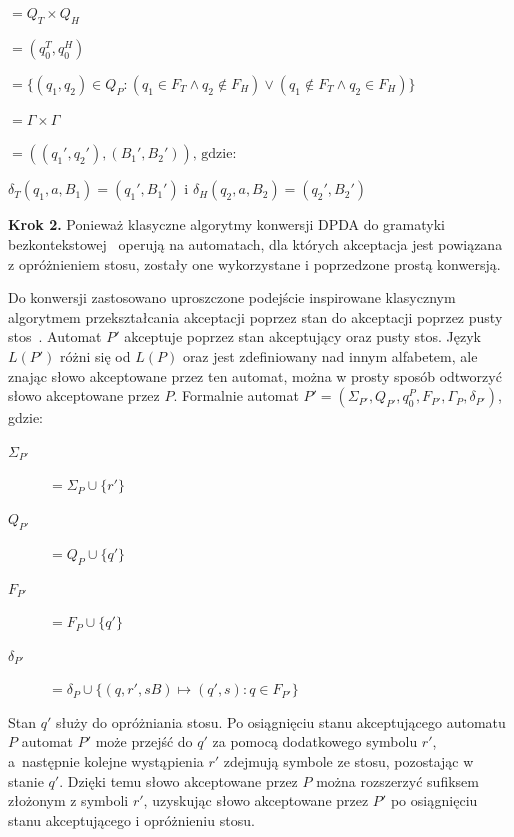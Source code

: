 \begin{description}
    \item[$Q_P$] $ = Q_T \times Q_H$
    \item[$q_0^P$] $ = (q_0^T, q_0^H)$
    \item[$F_P$] $= \{(q_1, q_2) \in Q_P : (q_1 \in F_T \land q_2 \notin F_H) \lor (q_1 \notin F_T \land q_2 \in F_H)\}$
    \item[$\Gamma_P$] $= \Gamma \times \Gamma$
    \item[$\delta_P((q_1, q_2), a, (B_1, B_2))$] $= ((q_1', q_2'), (B_1',B_2')) \text{, gdzie:}$
    \item $\delta_T(q_1, a, B_1) = (q_1', B_1') \text{ i } \delta_H(q_2, a, B_2) = (q_2', B_2')$
\end{description}

\textbf{Krok 2.} Ponieważ klasyczne algorytmy konwersji DPDA do gramatyki bezkontekstowej~\cite[6.3.2 From PDA’s to Grammars]{DPDAtoCFG}
\cite[2.2 Equivalence with context-free grammars]{Sipser} operują na automatach, dla których akceptacja jest powiązana z opróżnieniem stosu,
zostały one wykorzystane i poprzedzone prostą konwersją.

Do konwersji zastosowano uproszczone podejście inspirowane klasycznym algorytmem przekształcania
akceptacji poprzez stan do akceptacji poprzez pusty stos~\cite[6.2.4 From Final State to Empty Stack]{DPDAtoCFG}.
Automat $P'$ akceptuje poprzez stan akceptujący oraz pusty stos. Język $L(P')$ różni się od $L(P)$
oraz jest zdefiniowany nad innym alfabetem, ale znając słowo akceptowane przez ten automat,
można w prosty sposób odtworzyć słowo akceptowane przez $P$.
Formalnie automat $P' = (\Sigma_{P'}, Q_{P'}, q_0^P, F_{P'}, \Gamma_P, \delta_{P'})$, gdzie:

\begin{description}
    \item[$\Sigma_{P'}$] $ = \Sigma_P \cup \{r'\}$
    \item[$Q_{P'}$] $ = Q_P \cup \{q'\}$
    \item[$F_{P'}$] $ = F_P \cup \{q'\}$
    \item[$\delta_{P'}$] $= \delta_P \cup \{(q, r', sB) \mapsto (q', s) : q \in F_{P'}\}$
\end{description}

Stan $q'$ służy do opróżniania stosu. Po osiągnięciu stanu akceptującego automatu $P$ automat $P'$ może przejść do $q'$ za pomocą
dodatkowego symbolu $r'$, a~następnie kolejne wystąpienia $r'$ zdejmują symbole ze stosu, pozostając w stanie $q'$.
Dzięki temu słowo akceptowane przez $P$ można rozszerzyć sufiksem złożonym z symboli $r'$,
uzyskując słowo akceptowane przez $P'$ po osiągnięciu stanu akceptującego i opróżnieniu stosu.


